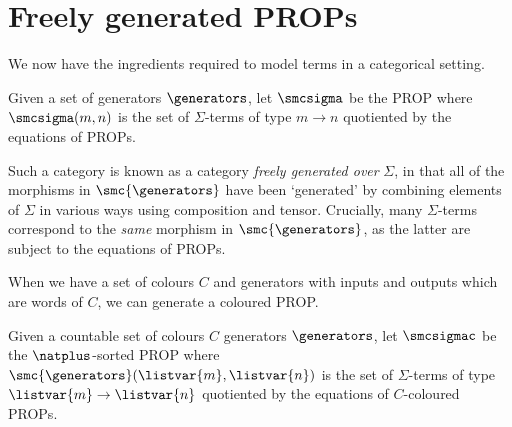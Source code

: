 \section{Freely generated PROPs}

We now have the ingredients required to model terms in a categorical setting.

\begin{definition}\label{def:freely-generated-prop}
    Given a set of generators \(\generators\), let \(\smcsigma\) be the
    PROP where \(\smcsigma(m, n)\) is the set of \(\Sigma\)-terms of type
    \(m \to n\) quotiented by the equations of PROPs.
\end{definition}

Such a category is known as a category \emph{freely generated over}
\(\Sigma\), in that all of the morphisms in \(\smc{\generators}\) have been
`generated' by combining elements of \(\Sigma\) in various ways using
composition and tensor.
Crucially, many \(\Sigma\)-terms correspond to the \emph{same} morphism in
\(\smc{\generators}\), as the latter are subject to the equations of PROPs.

When we have a set of colours \(C\) and generators with inputs and outputs which
are words of \(C\), we can generate a coloured PROP.

\begin{definition}\label{def:freely-generated-coloured-prop}
    Given a countable set of colours \(C\) generators \(\generators\), let
    \(\smcsigmac\) be the
    \(\natplus\)-sorted PROP where
    \(\smc{\generators}(\listvar{m}, \listvar{n})\) is the set of
    \(\Sigma\)-terms of type \(\listvar{m} \to \listvar{n}\) quotiented by
    the equations of \(C\)-coloured PROPs.
\end{definition}
